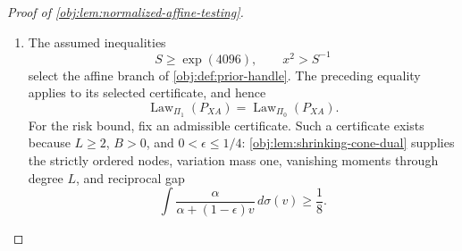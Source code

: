 \begin{proof}[Proof of \cref{obj:lem:normalized-affine-testing}]
\begin{enumerate}
For every \(v\in[0,B]\), the raw arm masses satisfy
\[
\begin{aligned}
S_1(v)+S_0(v)&=b_0+v=w_*(v),\\
S_1(v)-\epsilon w_*(v)&=(1-2\epsilon)v\ge0,\\
(1-\epsilon)w_*(v)-S_1(v)&=(1-2\epsilon)b_0\ge0.
\end{aligned}
\]
Both raw arms are positive. The assigned conditional means belong to \([0,1]\), and summing the raw complete-record table over all atoms gives
\[
p_*+\sum_{j=1}^{K_*}w_*(V_j)=Q.
\]
Division by \(Q\) therefore produces probability tables. Their occupied rare cells satisfy the overlap inequalities above; the reservoir has propensity \(1/2\); and the remaining cells have mass zero. Thus
\[
P_\iota(\boldsymbol\lambda)\in\mathcal M_{d,\epsilon},
\qquad
\iota\in\{0,1\},\quad
\boldsymbol\lambda=((V_j,c_j))_{j=1}^{K_*}\in\Lambda^{K_*},
\]
by \cref{obj:def:model}.

Summing out the outcome coordinate gives, under either hypothesis,
\[
(P_\iota(\boldsymbol\lambda))_{XA}(j,a)=
\begin{cases}
S_a(V_j)/Q,&1\le j\le K_*,\\
p_*/(2Q),&j=K_*+1,\\
0,&j>K_*+1.
\end{cases}
\]
In particular,
\[
(P_1(\boldsymbol\lambda))_{XA}
=(P_0(\boldsymbol\lambda))_{XA}
\quad\text{for every }\boldsymbol\lambda.
\]
Define the common product latent law and its pushforward priors by
\[
\nu_{\mathrm{lat}}=\nu_{\mathrm{cell}}^{\otimes K_*},
\qquad
\Pi_\iota^\sigma=\operatorname{Law}_{\nu_{\mathrm{lat}}}
\bigl(P_\iota(\boldsymbol\lambda)\bigr).
\]
Pushing the pointwise equality through this common latent law yields
\[
\operatorname{Law}_{\Pi_1^\sigma}(P_{XA})
=\operatorname{Law}_{\Pi_0^\sigma}(P_{XA}).
\]

\item
The assumed inequalities
\[
S\ge\exp(4096),\qquad x^2>S^{-1}
\]
select the affine branch of \cref{obj:def:prior-handle}. The preceding equality applies to its selected certificate, and hence
\[
\operatorname{Law}_{\Pi_1}(P_{XA})
=\operatorname{Law}_{\Pi_0}(P_{XA}).
\]
For the risk bound, fix an admissible certificate. Such a certificate exists because \(L\ge2\), \(B>0\), and \(0<\epsilon\le1/4\): \cref{obj:lem:shrinking-cone-dual} supplies the strictly ordered nodes, variation mass one, vanishing moments through degree \(L\), and reciprocal gap
\[
\int\frac{\alpha}{\alpha+(1-\epsilon)v}\,d\sigma(v)\ge\frac18.
\]


\end{enumerate}
\end{proof}
